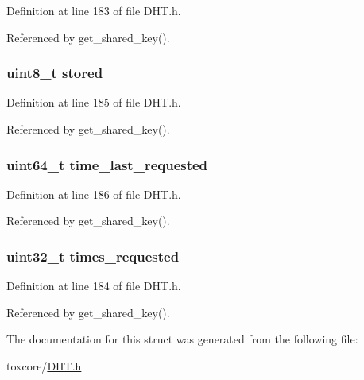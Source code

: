 Definition at line 183 of file D\+H\+T.\+h.



Referenced by get\+\_\+shared\+\_\+key().

\hypertarget{struct_shared___keys_a252513c1d10b32b19859efae45136a75}{
\subsubsection[{stored}]{\setlength{\rightskip}{0pt plus 5cm}uint8\+\_\+t stored}}\label{struct_shared___keys_a252513c1d10b32b19859efae45136a75}


Definition at line 185 of file D\+H\+T.\+h.



Referenced by get\+\_\+shared\+\_\+key().

\hypertarget{struct_shared___keys_a682dfdf8b648a40e36dd5865f16da424}{
\subsubsection[{time\+\_\+last\+\_\+requested}]{\setlength{\rightskip}{0pt plus 5cm}uint64\+\_\+t time\+\_\+last\+\_\+requested}}\label{struct_shared___keys_a682dfdf8b648a40e36dd5865f16da424}


Definition at line 186 of file D\+H\+T.\+h.



Referenced by get\+\_\+shared\+\_\+key().

\hypertarget{struct_shared___keys_ae433d486c059f93505368567603c2748}{
\subsubsection[{times\+\_\+requested}]{\setlength{\rightskip}{0pt plus 5cm}uint32\+\_\+t times\+\_\+requested}}\label{struct_shared___keys_ae433d486c059f93505368567603c2748}


Definition at line 184 of file D\+H\+T.\+h.



Referenced by get\+\_\+shared\+\_\+key().



The documentation for this struct was generated from the following file\+:\begin{DoxyCompactItemize}
\item 
toxcore/\hyperlink{_d_h_t_8h}{D\+H\+T.\+h}\end{DoxyCompactItemize}
